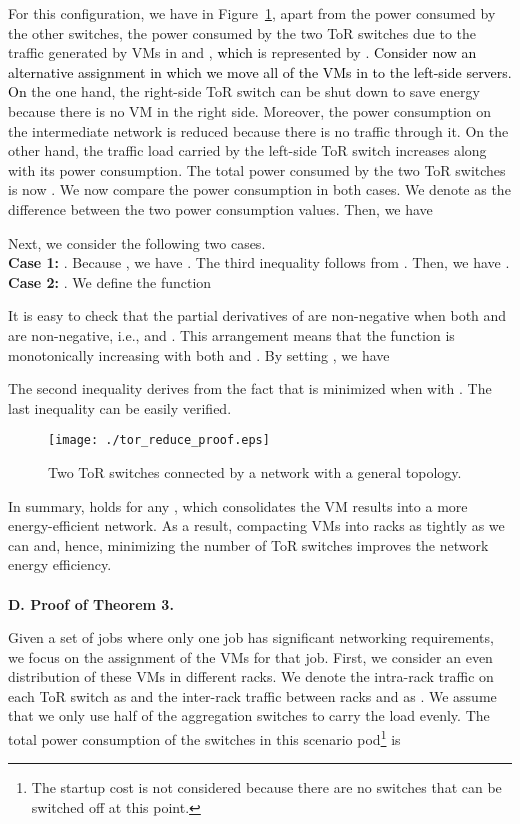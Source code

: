 \documentclass[journal,single-space,two column,twoside,10pt]{IEEEtran}
\begin{document}
For this configuration, we have in Figure~\ref{fig:tor_reduce_proof}, apart from the power consumed by the other switches, the power consumed by the two ToR switches due to the traffic generated by VMs in  and , \textcolor{black}{which} is represented by
.
\textcolor{black}{Consider now an alternative assignment in which we move all of the VMs in  to the left-side servers. On} the one hand, the right-side ToR switch can be shut down to save energy because there is no VM in the right side. Moreover, the power consumption on the intermediate network is reduced because there is no traffic through it. On the other hand, the traffic load carried by the left-side ToR switch increases along with its power consumption. The total power consumed by the two ToR switches is now
.
We now compare the power consumption in both cases. We denote  as the difference between the two power consumption values. Then, we have


Next, we consider the following two cases. \\
\textbf{Case 1:} . Because , we have
.
The third inequality follows from . Then, we have . \\
\textbf{Case 2:} . We define the function

It is easy to check that the partial derivatives of  are non-negative when both  and  are non-negative, i.e.,
 and .
This arrangement means that the function  is monotonically increasing with both  and . By setting , we have

The second inequality derives from the fact that  is minimized when  with . The last inequality can be easily verified.

\begin{figure}[!t]
\centering
\texttt{[image: ./tor\_reduce\_proof.eps]}
\caption{\label{fig:tor_reduce_proof} Two ToR switches connected by a network with a general topology.}
\end{figure}

In summary,  holds for any , which consolidates the VM results into a more energy-efficient network.
As a result, compacting VMs into racks as tightly as we can and, hence, minimizing the number of ToR switches improves the network energy efficiency. 
\\\\
\noindent\textbf{D. Proof of Theorem 3.}

Given a set of jobs where only one job has significant networking requirements, we focus on the assignment of the VMs for that job. First, we consider an even distribution of these VMs in  different racks. We denote the intra-rack traffic on each ToR switch as   and the inter-rack traffic between  racks  and  as  . We assume that we only use half of the aggregation switches to carry the load evenly.
The total power consumption of the switches in this scenario pod\footnote{The startup cost  is not considered because there are no switches that can be switched off at this point.} is
\end{document}

